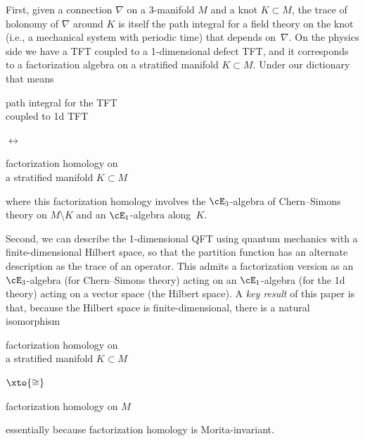 \documentclass[10pt]{amsart}
\begin{document}
First,
given a connection $\nabla$ on a 3-manifold $M$ and a knot $K \subset M$,
the trace of holonomy of $\nabla$ around $K$ is itself the path integral for a field theory on the knot
(i.e., a mechanical system with periodic time) that depends on~$\nabla$.
On the physics side we have a TFT coupled to a 1-dimensional defect TFT,
and it corresponds to a factorization algebra on a stratified manifold ${K \subset M}$.
Under our dictionary that means
\begin{center}
\begin{minipage}{.35\textwidth}
{\selectfont
path integral for the TFT\\coupled to 1d TFT }
\end{minipage}
$\longleftrightarrow\quad$ 
\begin{minipage}{.4\textwidth}
{\selectfont
factorization homology on \\a stratified manifold $K \subset M$}
\end{minipage}
\end{center}
where this factorization homology involves the $\cE_3$-algebra of Chern--Simons theory on $M \setminus K$ and an $\cE_1$-algebra along~$K$.

Second, we can describe the 1-dimensional QFT using quantum mechanics with a finite-dimensional Hilbert space,
so that the partition function has an alternate description as the trace of an operator.
This admits a factorization version as an $\cE_3$-algebra (for Chern--Simons theory) acting on an $\cE_1$-algebra (for the 1d theory) acting on a vector space (the Hilbert space).
A {\em key result} of this paper is that, because the Hilbert space is finite-dimensional, there is a natural isomorphism
\begin{center}
\begin{minipage}{.4\textwidth}
{\selectfont
factorization homology on \\a stratified manifold $K \subset M$}
\end{minipage}
$\xto{\cong}\quad$ 
\begin{minipage}{.4\textwidth}
{\selectfont
factorization homology on $M$}
\end{minipage}
\end{center}
essentially because factorization homology is Morita-invariant.
\end{document}
